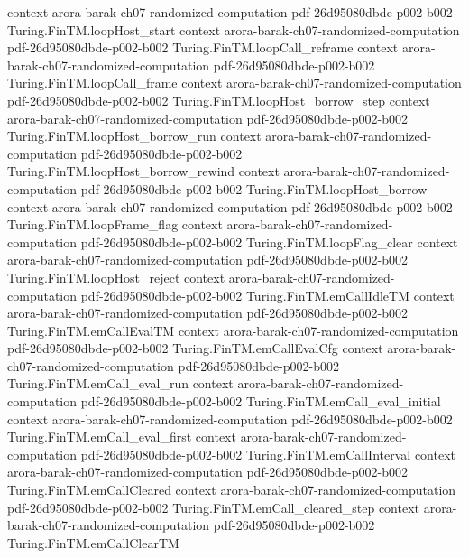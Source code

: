 \begin{theorem}
  {context}
  {arora-barak-ch07-randomized-computation}
  {pdf-26d95080dbde-p002-b002}
\proofstep
  {Turing.FinTM.loopHost_start}
  {context}
  {arora-barak-ch07-randomized-computation}
  {pdf-26d95080dbde-p002-b002}
\proofstep
  {Turing.FinTM.loopCall_reframe}
  {context}
  {arora-barak-ch07-randomized-computation}
  {pdf-26d95080dbde-p002-b002}
\proofstep
  {Turing.FinTM.loopCall_frame}
  {context}
  {arora-barak-ch07-randomized-computation}
  {pdf-26d95080dbde-p002-b002}
\proofstep
  {Turing.FinTM.loopHost_borrow_step}
  {context}
  {arora-barak-ch07-randomized-computation}
  {pdf-26d95080dbde-p002-b002}
\proofstep
  {Turing.FinTM.loopHost_borrow_run}
  {context}
  {arora-barak-ch07-randomized-computation}
  {pdf-26d95080dbde-p002-b002}
\proofstep
  {Turing.FinTM.loopHost_borrow_rewind}
  {context}
  {arora-barak-ch07-randomized-computation}
  {pdf-26d95080dbde-p002-b002}
\proofstep
  {Turing.FinTM.loopHost_borrow}
  {context}
  {arora-barak-ch07-randomized-computation}
  {pdf-26d95080dbde-p002-b002}
\proofstep
  {Turing.FinTM.loopFrame_flag}
  {context}
  {arora-barak-ch07-randomized-computation}
  {pdf-26d95080dbde-p002-b002}
\proofstep
  {Turing.FinTM.loopFlag_clear}
  {context}
  {arora-barak-ch07-randomized-computation}
  {pdf-26d95080dbde-p002-b002}
\proofstep
  {Turing.FinTM.loopHost_reject}
  {context}
  {arora-barak-ch07-randomized-computation}
  {pdf-26d95080dbde-p002-b002}
\proofstep
  {Turing.FinTM.emCallIdleTM}
  {context}
  {arora-barak-ch07-randomized-computation}
  {pdf-26d95080dbde-p002-b002}
\proofstep
  {Turing.FinTM.emCallEvalTM}
  {context}
  {arora-barak-ch07-randomized-computation}
  {pdf-26d95080dbde-p002-b002}
\proofstep
  {Turing.FinTM.emCallEvalCfg}
  {context}
  {arora-barak-ch07-randomized-computation}
  {pdf-26d95080dbde-p002-b002}
\proofstep
  {Turing.FinTM.emCall_eval_run}
  {context}
  {arora-barak-ch07-randomized-computation}
  {pdf-26d95080dbde-p002-b002}
\proofstep
  {Turing.FinTM.emCall_eval_initial}
  {context}
  {arora-barak-ch07-randomized-computation}
  {pdf-26d95080dbde-p002-b002}
\proofstep
  {Turing.FinTM.emCall_eval_first}
  {context}
  {arora-barak-ch07-randomized-computation}
  {pdf-26d95080dbde-p002-b002}
\proofstep
  {Turing.FinTM.emCallInterval}
  {context}
  {arora-barak-ch07-randomized-computation}
  {pdf-26d95080dbde-p002-b002}
\proofstep
  {Turing.FinTM.emCallCleared}
  {context}
  {arora-barak-ch07-randomized-computation}
  {pdf-26d95080dbde-p002-b002}
\proofstep
  {Turing.FinTM.emCall_cleared_step}
  {context}
  {arora-barak-ch07-randomized-computation}
  {pdf-26d95080dbde-p002-b002}
\proofstep
  {Turing.FinTM.emCallClearTM}

\end{theorem}
